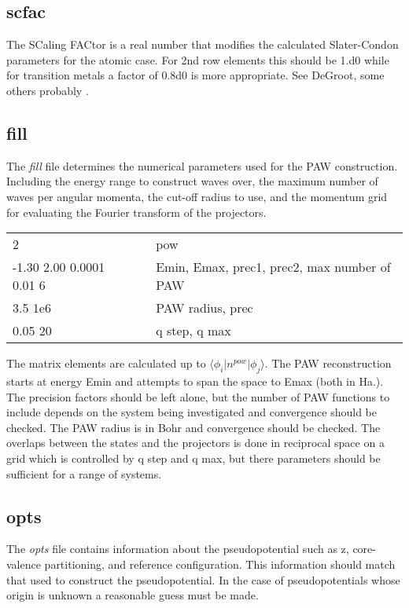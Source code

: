 \documentclass[11pt]{report}
\begin{document}
\subsection{scfac}
The SCaling FACtor is a real number that modifies the calculated Slater-Condon parameters for the atomic case. For 2nd row elements this should be 1.d0 while for transition metals a factor of 0.8d0 is more appropriate. See DeGroot, some others probably \cite{SCFAC}.

\subsection{fill}
\label{fill}
The \emph{fill} file determines the numerical parameters used for the PAW construction. Including the energy range to construct waves over, the maximum number of waves per angular momenta, the cut-off radius to use, and the momentum grid for evaluating the Fourier transform of the projectors. 

\begin{center}
\begin{tabular}{| l | c l |}
\hline
2						& &  pow \\
-1.30 2.00 0.0001 0.01 6		& & Emin, Emax, prec1, prec2, max number of PAW \\
3.5 1e6					& & PAW radius, prec \\
0.05 20					& & q step, q max \\
\hline
\end{tabular}
\end{center}

The matrix elements are calculated up to $\langle \phi_i \vert n^{pow} \vert \phi_j \rangle$. The PAW reconstruction starts at energy Emin and attempts to span the space to Emax (both in Ha.). The precision factors should be left alone, but the number of PAW functions to include depends on the system being investigated and convergence should be checked. The PAW radius is in Bohr and convergence should be checked. The overlaps between the states and the projectors is done in reciprocal space on a grid which is controlled by q step and q max, but there parameters should be sufficient for a range of systems.


\subsection{opts}
The \emph{opts} file contains information about the pseudopotential such as z, core-valence partitioning, and reference configuration. This information should match that used to construct the pseudopotential. In the case of pseudopotentials 
whose origin is unknown a reasonable guess must be made.
\end{document}
